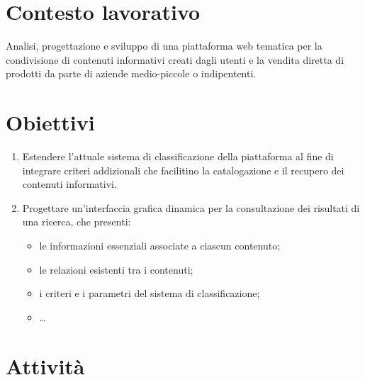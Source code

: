\documentclass[10pt,a4paper,hidelinks]{scrartcl} %
\begin{document}
    \title{\rmfamily\normalfont{}}
    \author{}
    \date{\today}
    
    \maketitle
    
    \begin{abstract}
        \noindent Piano di lavoro settimanale per stage esterno presso \textsf{FondaMente}.
    \end{abstract}
    
	\tableofcontents

    \section{Contesto lavorativo}
	Analisi, progettazione e sviluppo di una piattaforma web tematica per la condivisione di contenuti informativi creati dagli utenti e la vendita diretta di prodotti da parte di aziende medio-piccole o indipententi.

	\section{Obiettivi}
	\begin{enumerate}
		\item Estendere l'attuale sistema di classificazione della piattaforma al fine di integrare criteri addizionali che facilitino la catalogazione e il recupero dei contenuti informativi.
		\item Progettare un'interfaccia grafica dinamica per la consultazione dei risultati di una ricerca, che presenti:
		\begin{itemize}
			\item le informazioni essenziali associate a ciascun contenuto;
			\item le relazioni esistenti tra i contenuti;
			\item i criteri e i parametri del sistema di classificazione;
			\item \ldots
		\end{itemize}
	\end{enumerate}

	\section{Attivit\`a}
	
\end{document}
